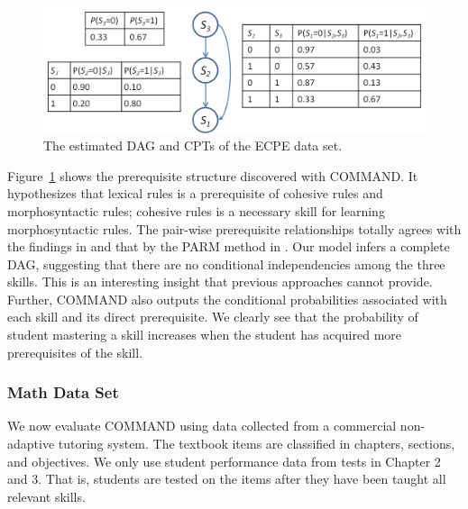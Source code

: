 \documentclass{edm_template}
\begin{document}
				\begin{figure}[!th]
					\begin{center}
						\centering
						\includegraphics[width=0.95\linewidth]{figures/ecpe_results.png}
					\end{center}
					\vspace{-1em}
					\caption{%
						The estimated DAG and CPTs of the ECPE data set.}
					\label{fig:ecpe-result} 
				\end{figure}
					 				
	Figure~\ref{fig:ecpe-result} shows the prerequisite structure discovered with COMMAND. %
	It hypothesizes that lexical rules is a prerequisite of cohesive rules and morphosyntactic rules; 
	cohesive rules is a necessary skill for learning morphosyntactic rules. 
	The pair-wise prerequisite relationships totally agrees with the findings in \cite{templin2014hierarchical} and that by the PARM method in \cite{chen2015discovering}.
	Our model infers a complete DAG, suggesting that there are no conditional independencies among the three skills.
	This is an interesting insight that previous approaches cannot provide.   
	Further, COMMAND also outputs the conditional probabilities associated with each skill and its direct prerequisite.
	We clearly see that the probability of student mastering a skill increases when the student has acquired more prerequisites of the skill.
	
	
	\subsubsection{Math Data Set}
	We now evaluate COMMAND using data collected from a commercial non-adaptive tutoring system.
	The textbook items are classified in chapters, sections, and objectives.
	We only use  student performance data from tests in Chapter 2 and  3.
	That is, students are tested on the items after they have been taught all relevant skills.
	
\end{document}
